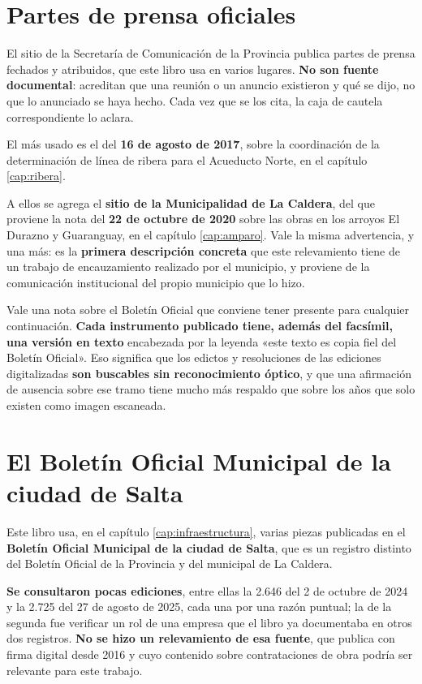 \section{Partes de prensa oficiales}

El sitio de la Secretaría de Comunicación de la Provincia publica partes de prensa fechados y
atribuidos, que este libro usa en varios lugares. \textbf{No son fuente documental}: acreditan
que una reunión o un anuncio existieron y qué se dijo, no que lo anunciado se haya hecho.
Cada vez que se los cita, la caja de cautela correspondiente lo aclara.

El más usado es el del \textbf{16 de agosto de 2017}, sobre la coordinación de la
determinación de línea de ribera para el Acueducto Norte, en el capítulo \ref{cap:ribera}.

A ellos se agrega el \textbf{sitio de la Municipalidad de La Caldera}, del que proviene la
nota del \textbf{22 de octubre de 2020} sobre las obras en los arroyos El Durazno y
Guaranguay, en el capítulo \ref{cap:amparo}. Vale la misma advertencia, y una más: es la
\textbf{primera descripción concreta} que este relevamiento tiene de un trabajo de
encauzamiento realizado por el municipio, y proviene de la comunicación institucional del
propio municipio que lo hizo.

\begin{cautela}
Vale una nota sobre el Boletín Oficial que conviene tener presente para cualquier
continuación. \textbf{Cada instrumento publicado tiene, además del facsímil, una versión en
texto} encabezada por la leyenda «este texto es copia fiel del Boletín Oficial». Eso significa
que los edictos y resoluciones de las ediciones digitalizadas \textbf{son buscables sin
reconocimiento óptico}, y que una afirmación de ausencia sobre ese tramo tiene mucho más
respaldo que sobre los años que solo existen como imagen escaneada.
\end{cautela}

\section{El Boletín Oficial Municipal de la ciudad de Salta}

Este libro usa, en el capítulo \ref{cap:infraestructura}, varias piezas publicadas en el \textbf{Boletín Oficial Municipal de la ciudad de Salta}, que es un registro distinto del Boletín Oficial de la Provincia y del municipal de La Caldera.

\textbf{Se consultaron pocas ediciones}, entre ellas la 2.646 del 2 de octubre de 2024 y la 2.725 del 27 de agosto de 2025, cada una por una razón puntual; la de la segunda fue verificar un rol de una empresa que el libro ya documentaba en otros dos registros. \textbf{No se hizo un relevamiento de esa fuente}, que publica con firma digital desde 2016 y cuyo contenido sobre contrataciones de obra podría ser relevante para este trabajo.

